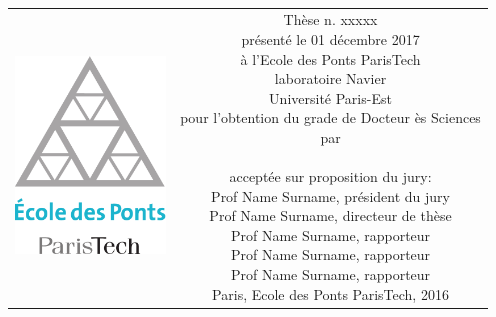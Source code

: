 \begin{titlepage}
\begin{center}
\sffamily


\null\vspace{2cm}
{\huge \mytitle} \\[24pt] 
    
\vfill

\begin{tabular} {cc}
\parbox{0.3\textwidth}{\includegraphics[width=4cm]{head/logo_enpc}}
&
\parbox{0.7\textwidth}{%
	Thèse n. xxxxx\\
	présenté le 01 décembre 2017\\
	à l'Ecole des Ponts ParisTech\\
	laboratoire Navier\\
%
	Université Paris-Est\\[6pt]
	pour l'obtention du grade de Docteur ès Sciences\\
	par\\ [4pt]
	\null \hspace{3em} \myauthor\\[9pt]
%
\small
acceptée sur proposition du jury:\\[4pt]
%
    Prof Name Surname, président du jury\\
    Prof Name Surname, directeur de thèse\\
    Prof Name Surname, rapporteur\\
    Prof Name Surname, rapporteur\\
    Prof Name Surname, rapporteur\\[12pt]
%
Paris, Ecole des Ponts ParisTech, 2016}
\end{tabular}
\end{center}
\vspace{2cm}
\end{titlepage}



